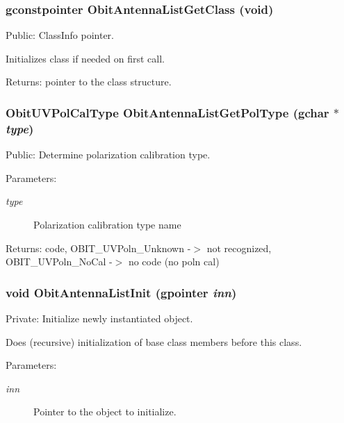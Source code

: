 \subsubsection{\setlength{\rightskip}{0pt plus 5cm}gconstpointer Obit\-Antenna\-List\-Get\-Class (void)}\label{ObitAntennaList_8c_a7}


Public: Class\-Info pointer. 

Initializes class if needed on first call. \begin{Desc}
\item[Returns:]pointer to the class structure. \end{Desc}
\subsubsection{\setlength{\rightskip}{0pt plus 5cm}Obit\-UVPol\-Cal\-Type Obit\-Antenna\-List\-Get\-Pol\-Type (gchar $\ast$ {\em type})}\label{ObitAntennaList_8c_a10}


Public: Determine polarization calibration type. 

\begin{Desc}
\item[Parameters:]
\begin{description}
\item[{\em type}]Polarization calibration type name \end{description}
\end{Desc}
\begin{Desc}
\item[Returns:]code, OBIT\_\-UVPoln\_\-Unknown -$>$ not recognized, OBIT\_\-UVPoln\_\-No\-Cal -$>$ no code (no poln cal) \end{Desc}
\subsubsection{\setlength{\rightskip}{0pt plus 5cm}void Obit\-Antenna\-List\-Init (gpointer {\em inn})}\label{ObitAntennaList_8c_a3}


Private: Initialize newly instantiated object. 

Does (recursive) initialization of base class members before this class. \begin{Desc}
\item[Parameters:]
\begin{description}
\item[{\em inn}]Pointer to the object to initialize. \end{description}
\end{Desc}
